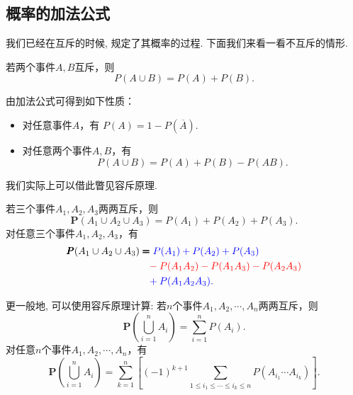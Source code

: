 
\subsection{概率的加法公式}
我们已经在互斥的时候, 规定了其概率的过程. 下面我们来看一看不互斥的情形.
\begin{proposition}[加法公式]
    若两个事件$A,B$互斥，则
    $$P(A\cup B)=P(A)+P(B).$$
\end{proposition}

\begin{remark}
    由加法公式可得到如下性质：
    \begin{itemize}
        \item 对任意事件$A$，有
              $P(A)=1-P\left(\overline{A}\right).$
        \item 对任意两个事件$A,B$，有
              $$P(A\cup B)=P(A)+P(B)-P(AB).$$
    \end{itemize}
\end{remark}

\begin{asidebox}
    我们实际上可以借此瞥见容斥原理.
    \begin{remark}
        若三个事件$A_1, A_2, A_3$两两互斥，则
        $$\pmb P(A_1 \cup A_2 \cup A_3) = P(A_1)+P(A_2)+P(A_3).$$
        对任意三个事件$A_1, A_2, A_3$，有
        \begin{align*}
            \pmb P(A_1 \cup A_2 \cup A_3) & \pmb=\color{blue}P(A_1)+P(A_2)+P(A_3)              \\
                                          & \phantom=\color{red}-P(A_1A_2)-P(A_1A_3)-P(A_2A_3) \\
                                          & \phantom=\color{blue}+P(A_1A_2A_3).
        \end{align*}%
    \end{remark}

    \begin{remark}
        更一般地, 可以使用容斥原理计算:
        若$n$个事件$A_1, A_2, \cdots, A_n$两两互斥，则
        $$\pmb P\left( \bigcup_{i=1}^n A_i \right)=\sum_{i=1}^n P(A_i).$$
        \vspace{0.2in}
        对任意$n$个事件$A_1, A_2, \cdots, A_n$，有
        $$\pmb P\left( \bigcup_{i=1}^n A_i \right)=\sum_{k=1}^n \left[ (-1)^{k+1} \sum_{1\le i_1\le \cdots\le i_k \le n} P(A_{i_1}\cdots A_{i_k}) \right].$$
    \end{remark}


\end{asidebox}

